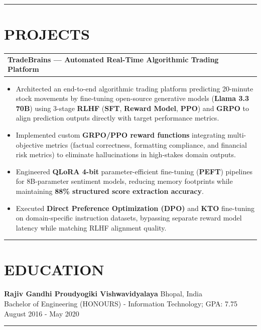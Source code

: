 \documentclass[a4paper]{article}
\newcommand{\sectionline}{
\begin{center}
\vspace{-9pt}
\rule{1\textwidth}{0.5pt}
\end{center}
\vspace{1pt}
}
\begin{document}
\sectionline
\section*{PROJECTS}
\begin{tabularx}{\textwidth}{@{} X >{\raggedleft\arraybackslash}p{8cm} @{}}
\textbf{TradeBrains — Automated Real-Time Algorithmic Trading Platform}
\end{tabularx}
\begin{itemize}
\vspace{4pt}
\item {Architected an end-to-end algorithmic trading platform predicting 20-minute stock movements by fine-tuning open-source generative models (\textbf{Llama 3.3 70B}) using 3-stage \textbf{RLHF} (\textbf{SFT}, \textbf{Reward Model}, \textbf{PPO}) and \textbf{GRPO} to align prediction outputs directly with target performance metrics.}
\item {Implemented custom \textbf{GRPO/PPO reward functions} integrating multi-objective metrics (factual correctness, formatting compliance, and financial risk metrics) to eliminate hallucinations in high-stakes domain outputs.}
\item {Engineered \textbf{QLoRA 4-bit} parameter-efficient fine-tuning (\textbf{PEFT}) pipelines for 8B-parameter sentiment models, reducing memory footprints while maintaining \textbf{88\% structured score extraction accuracy}.}
\item {Executed \textbf{Direct Preference Optimization (DPO)} and \textbf{KTO} fine-tuning on domain-specific instruction datasets, bypassing separate reward model latency while matching RLHF alignment quality.}
\end{itemize}

\sectionline
\section*{EDUCATION}
\textbf{Rajiv Gandhi Proudyogiki Vishwavidyalaya} \hfill Bhopal, India \\[2pt]
Bachelor of Engineering (HONOURS) - Information Technology; GPA: 7.75 
\hfill August 2016 - May 2020

\sectionline
\end{document}
